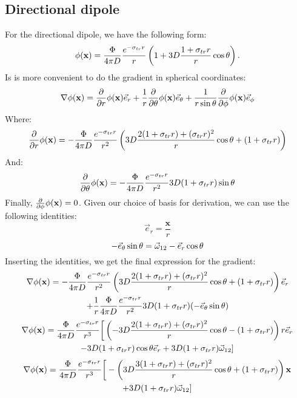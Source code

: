\documentclass[10pt,a4paper]{article}
\begin{document}
\subsection{Directional dipole}
For the directional dipole, we have the following form:
$$
{\phi}(\mathbf{x}) = \frac{\Phi}{4\pi D} \frac{e^{- \sigma_{tr} r}}{ r} \left( 1 
    + 3 D \frac{1 + \sigma_{tr} r}{r} \cos \theta \right).
$$
Is is more convenient to do the gradient in spherical coordinates:
$$
\nabla {\phi}(\mathbf{x}) = \frac{\partial}{\partial r} {\phi}(\mathbf{x}) \vec{e}_r + \frac{1}{r} \frac{\partial}{\partial \theta} {\phi}(\mathbf{x}) \vec{e}_\theta +  \frac{1}{r \sin \theta}  \frac{\partial}{\partial \phi} {\phi}(\mathbf{x}) \vec{e}_\phi
$$
Where:
$$
 \frac{\partial}{\partial r} {\phi}(\mathbf{x}) = - \frac{\Phi}{4\pi D} \frac{e^{- \sigma_{tr} r}}{ r^2} \left( 3D \frac{2 (1 + \sigma_{tr} r)  + (\sigma_{tr} r)^2}{r} \cos\theta + (1 + \sigma_{tr} r) \right)
$$
And:
$$
 \frac{\partial}{\partial \theta} {\phi}(\mathbf{x}) = - \frac{\Phi}{4\pi D} \frac{e^{- \sigma_{tr} r}}{ r^2} 3D (1 + \sigma_{tr} r) \sin\theta
 $$ 
Finally, $ \frac{\partial}{\partial \phi} {\phi}(\mathbf{x}) = 0$. Given our choice of basis for derivation, we can use the following identities:
$$
\vec{e}_r = \frac{\mathbf{x}}{r}
$$
$$
- \vec{e}_\theta \sin\theta = \vec{\omega}_{12} - \vec{e}_r \cos\theta 
$$
Inserting the identities, we get the final expression for the gradient:
\begin{multline*}
\nabla {\phi}(\mathbf{x}) = - \frac{\Phi}{4\pi D} \frac{e^{- \sigma_{tr} r}}{ r^2} \left( 3D \frac{2 (1 + \sigma_{tr} r)  + (\sigma_{tr} r)^2}{r} \cos\theta + (1 + \sigma_{tr} r) \right) \vec{e}_r \\ + \frac{1}{r}  \frac{\Phi}{4\pi D} \frac{e^{- \sigma_{tr} r}}{ r^2} 3D (1 + \sigma_{tr} r) (- \vec{e}_\theta \sin\theta)
\end{multline*}
\begin{multline*}
\nabla {\phi}(\mathbf{x}) =\frac{\Phi}{4\pi D} \frac{e^{- \sigma_{tr} r}}{ r^3} \bigg[ \left( -3D \frac{2 (1 + \sigma_{tr} r)  + (\sigma_{tr} r)^2}{r} \cos\theta - (1 + \sigma_{tr} r) \right) r \vec{e}_r  \\-  3D (1 + \sigma_{tr} r) \cos\theta \vec{e}_r + 3D (1 + \sigma_{tr} r) \vec{\omega}_{12} ]
\end{multline*}
\begin{multline*}
\nabla {\phi}(\mathbf{x}) =\frac{\Phi}{4\pi D} \frac{e^{- \sigma_{tr} r}}{ r^3} \bigg[ -\left( 3D \frac{3 (1 + \sigma_{tr} r)  + (\sigma_{tr} r)^2}{r} \cos\theta + (1 + \sigma_{tr} r) \right) \mathbf{x}  \\ + 3D (1 + \sigma_{tr} r) \vec{\omega}_{12} ]
\end{multline*}
\end{document}
